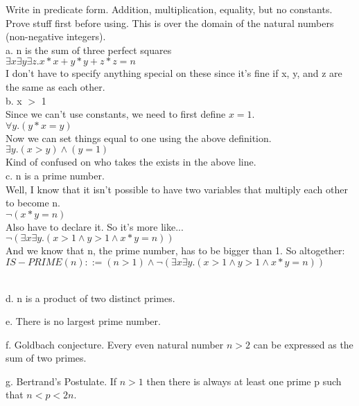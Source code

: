\documentclass{article}
\begin{document}
Write in predicate form. Addition, multiplication, equality, but no constants. Prove stuff first before using. This is over the domain of the natural numbers (non-negative integers).
\\
a. n is the sum of three perfect squares \\
$\exists x \exists y \exists z. x*x + y*y + z*z = n$
\\
I don't have to specify anything special on these since it's fine if x, y, and z are the same as each other. 
\\
b. x $>$ 1
\\
Since we can't use constants, we need to first define $x = 1$. 
\\
$\forall y. (y*x = y)$
\\
Now we can set things equal to one using the above definition. 
\\
$\exists y. (x > y) \wedge (y = 1)$
\\
Kind of confused on who takes the exists in the above line. 
\\
c. n is a prime number.
\\
Well, I know that it isn't possible to have two variables that multiply each other to become n. 
\\
$\neg(x*y = n)$
\\
Also have to declare it. So it's more like...
\\
$\neg (\exists x \exists y. (x > 1 \wedge y > 1 \wedge x*y = n))$
\\
And we know that n, the prime number, has to be bigger than 1. So altogether:
\\
$IS-PRIME(n) ::= (n > 1) \wedge \neg (\exists x \exists y. (x > 1 \wedge y > 1 \wedge x*y = n))$

\\
d. n is a product of two distinct primes.

e. There is no largest prime number.

f. Goldbach conjecture. Every even natural number $n > 2$ can be expressed as the sum of two primes. 

g. Bertrand's Postulate. If $n > 1$ then there is always at least one prime p such that $n < p < 2n$.
\end{document}
